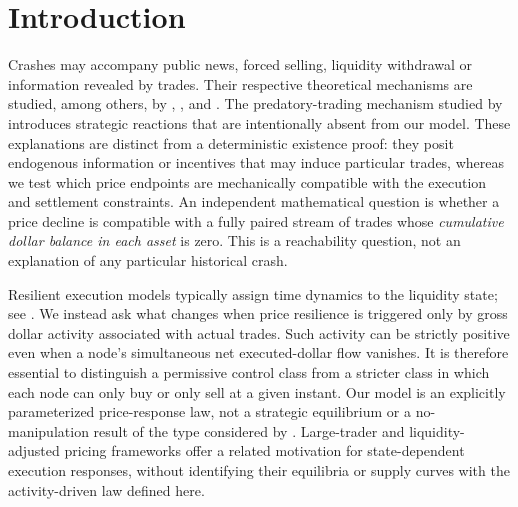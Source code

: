 \documentclass[review,hidelinks,onefignum,onetabnum]{siamonline250211}%
\begin{document}
\section{Introduction}\label{sec:intro}
Crashes may accompany public news, forced selling, liquidity withdrawal or
information revealed by trades. Their respective theoretical mechanisms are
studied, among others, by \citet{GennotteLeland1990,Romer1993},
\citet{HuangWang2009,CespaFoucault2014}, and \citet{ContWagalath2013}.
The predatory-trading mechanism studied by
\citet{BrunnermeierPedersen2005} introduces strategic reactions
that are intentionally absent from our model. These explanations
are distinct from a deterministic existence proof: they posit
endogenous information or incentives that may induce particular
trades, whereas we test which price endpoints are mechanically
compatible with the execution and settlement constraints.
An independent mathematical question is whether a price decline is compatible
with a fully paired stream of trades whose \emph{cumulative dollar balance
in each asset} is zero. This is a reachability question, not an explanation
of any particular historical crash.

Resilient execution models typically assign time dynamics to the liquidity
state; see \citet{ObizhaevaWang2013,AlfonsiSchied2010}. We instead ask what
changes when price resilience is triggered only by gross dollar activity
associated with actual trades. Such activity can be strictly positive even
when a node's simultaneous net executed-dollar flow vanishes. It is therefore
essential to distinguish a permissive control class from a stricter class
in which each node can only buy or only sell at a given instant. Our model
is an explicitly parameterized price-response law, not a strategic equilibrium
or a no-manipulation result of the type considered by
\citet{Gatheral2010,HubermanStanzl2004}.
Large-trader and liquidity-adjusted pricing frameworks
\citep{BankBaum2004,CetinJarrowProtter2004} offer a related
motivation for state-dependent execution responses, without
identifying their equilibria or supply curves with the
activity-driven law defined here.
\end{document}
